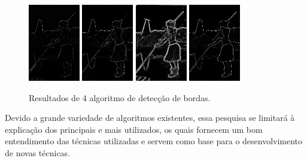 \begin{figure}[!htb]
 \centering
 \def\baselinestretch{1}\small\normalsize
 \includegraphics[width=0.2\textwidth]{img/101087-77.jpg}\qquad
 \includegraphics[width=0.2\textwidth]{img/101087-80.jpg}  \qquad 
  \includegraphics[width=0.2\textwidth]{img/101087-82.jpg}  \qquad
 \includegraphics[width=0.2\textwidth]{img/101087-85.jpg}        
 \caption{\label{fig:indiosegmentado}Resultados de 4 algoritmo de detec\c{c}\~{a}o de bordas. \citep{berkeley}}
\end{figure}


Devido a grande variedade de algoritmos existentes, essa pesquisa se limitará à explicação dos principais e mais utilizados, os quais fornecem um bom entendimento das técnicas utilizadas e servem como base para o desenvolvimento de novas técnicas.


